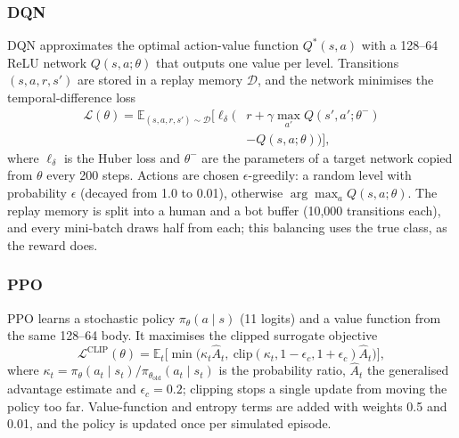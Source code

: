 \documentclass{ieeetj}
\begin{document}
\subsubsection{DQN}
DQN \cite{mnih_dqn_2015} approximates the optimal action-value function $Q^*(s,a)$ with a 128--64 ReLU network $Q(s,a;\theta)$ that outputs one value per level. Transitions $(s,a,r,s')$ are stored in a replay memory $\mathcal D$, and the network minimises the temporal-difference loss
\begin{equation}
\begin{aligned}
\mathcal L(\theta)=\mathbb E_{(s,a,r,s')\sim\mathcal D}\Big[\ell_\delta\big(&r+\gamma\max_{a'}Q(s',a';\theta^-)\\
&-Q(s,a;\theta)\big)\Big],
\end{aligned}
\end{equation}
where $\ell_\delta$ is the Huber loss and $\theta^-$ are the parameters of a target network copied from $\theta$ every 200 steps. Actions are chosen $\epsilon$-greedily: a random level with probability $\epsilon$ (decayed from 1.0 to 0.01), otherwise $\arg\max_a Q(s,a;\theta)$. The replay memory is split into a human and a bot buffer (10{,}000 transitions each), and every mini-batch draws half from each; this balancing uses the true class, as the reward does.

\vspace{-15pt}
\subsubsection{PPO}
PPO \cite{schulman_ppo_2017} learns a stochastic policy $\pi_\theta(a\mid s)$ (11 logits) and a value function from the same 128--64 body. It maximises the clipped surrogate objective
\begin{equation}
\mathcal L^{\text{CLIP}}(\theta)=\mathbb E_t\big[\min\big(\kappa_t\hat A_t,\ \mathrm{clip}(\kappa_t,1-\epsilon_c,1+\epsilon_c)\hat A_t\big)\big],
\end{equation}
where $\kappa_t=\pi_\theta(a_t\mid s_t)/\pi_{\theta_{\text{old}}}(a_t\mid s_t)$ is the probability ratio, $\hat A_t$ the generalised advantage estimate and $\epsilon_c=0.2$; clipping stops a single update from moving the policy too far. Value-function and entropy terms are added with weights 0.5 and 0.01, and the policy is updated once per simulated episode.

\vspace{-15pt}
\end{document}
